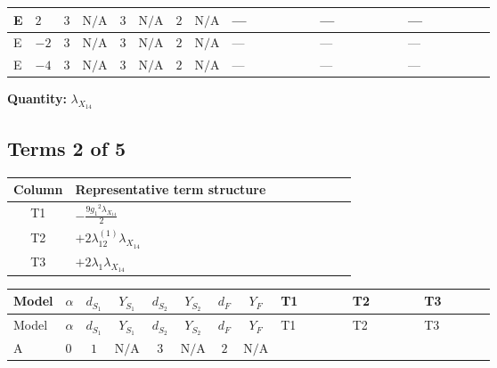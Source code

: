 \documentclass[8pt]{article}
\begin{document}
\begin{landscape}
\begin{longtable}{@{}llcccccc >{\raggedright\arraybackslash}p{0.21\linewidth} >{\raggedright\arraybackslash}p{0.21\linewidth} >{\raggedright\arraybackslash}p{0.21\linewidth}@{}}
\midrule
E & $2$ & $3$ & $\text{N/A}$ & $3$ & $\text{N/A}$ & $2$ & $\text{N/A}$ & --- & --- & --- \\
\midrule
E & $-2$ & $3$ & $\text{N/A}$ & $3$ & $\text{N/A}$ & $2$ & $\text{N/A}$ & --- & --- & --- \\
\midrule
E & $-4$ & $3$ & $\text{N/A}$ & $3$ & $\text{N/A}$ & $2$ & $\text{N/A}$ & --- & --- & --- \\
\midrule
\bottomrule
\end{longtable}
\clearpage
\noindent\textbf{Quantity: }${\lambda_{X_{14}}}$\par\smallskip
\subsection*{Terms 2 of 5}
\begin{center}
\begin{tabular}{@{}c >{\raggedright\arraybackslash}p{0.82\linewidth}@{}}
\toprule
Column & Representative term structure \\
\midrule
T1 & \(\displaystyle -\frac{9 {g_1}^2 {\lambda_{X_{14}}}}{2}\) \\
\midrule
T2 & \(\displaystyle +2 {\lambda_{12}^{(1)}} {\lambda_{X_{14}}}\) \\
\midrule
T3 & \(\displaystyle +2 {\lambda_1} {\lambda_{X_{14}}}\) \\
\midrule
\bottomrule
\end{tabular}
\end{center}
\smallskip
\tiny
\begin{longtable}{@{}llcccccc >{\raggedright\arraybackslash}p{0.21\linewidth} >{\raggedright\arraybackslash}p{0.21\linewidth} >{\raggedright\arraybackslash}p{0.21\linewidth}@{}}
\toprule
Model & $\alpha$ & $d_{S_1}$ & $Y_{S_1}$ & $d_{S_2}$ & $Y_{S_2}$ & $d_F$ & $Y_F$ & T1 & T2 & T3 \\
\midrule
\endfirsthead
\toprule
Model & $\alpha$ & $d_{S_1}$ & $Y_{S_1}$ & $d_{S_2}$ & $Y_{S_2}$ & $d_F$ & $Y_F$ & T1 & T2 & T3 \\
\midrule
\endhead
A & $0$ & $1$ & $\text{N/A}$ & $3$ & $\text{N/A}$ & $2$ & $\text{N/A}$ & \scriptsize\adjustbox{max width=\linewidth}{$\begin{gathered} -\frac{9 {g_1}^2 {\lambda_{X_{14}}}}{2}\end{gathered}$} & \scriptsize\adjustbox{max width=\linewidth}{$\begin{gathered} +2 {\lambda_{12}^{(1)}} {\lambda_{X_{14}}}\end{gathered}$} & \scriptsize\adjustbox{max width=\linewidth}{$\begin{gathered} +2 {\lambda_1} {\lambda_{X_{14}}}\end{gathered}$} \\

\end{longtable}
\end{landscape}
\end{document}
